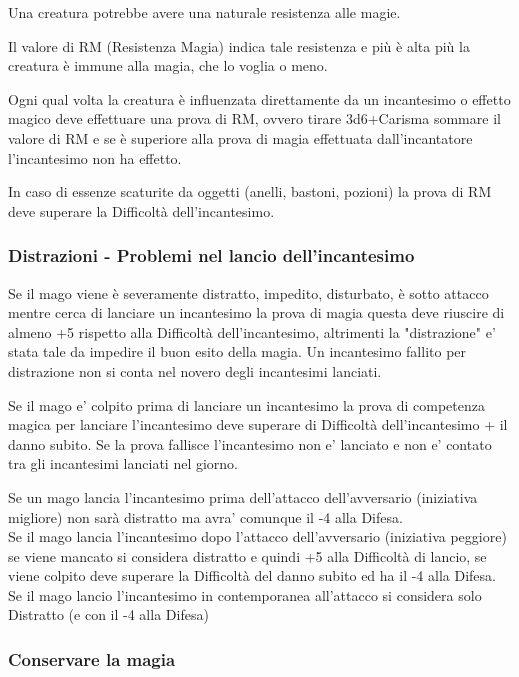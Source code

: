 \begin{multicols}{2}
Una creatura potrebbe avere una naturale resistenza alle magie.

Il valore di RM (Resistenza Magia) indica tale resistenza e più è alta più la creatura è immune alla magia, che lo voglia o meno.

Ogni qual volta la creatura è influenzata direttamente da un incantesimo o effetto magico deve effettuare una prova di RM, ovvero tirare 3d6+Carisma sommare il valore di RM e se è superiore alla prova di magia effettuata dall'incantatore l'incantesimo non ha effetto.

In caso di essenze scaturite da oggetti (anelli, bastoni, pozioni) la prova di RM deve superare la Difficoltà dell'incantesimo.

\subsubsection{Distrazioni - Problemi nel lancio dell'incantesimo}

Se il mago viene è severamente distratto, impedito, disturbato, è sotto attacco mentre cerca di lanciare un incantesimo la prova di magia questa deve riuscire di almeno +5 rispetto alla Difficoltà dell'incantesimo, altrimenti la "distrazione" e' stata tale da impedire il buon esito della magia.
Un incantesimo fallito per distrazione non si conta nel novero degli incantesimi lanciati.

Se il mago e' colpito prima di lanciare un incantesimo la prova di competenza magica per lanciare l'incantesimo deve superare di Difficoltà dell'incantesimo + il danno subito. Se la prova fallisce l'incantesimo non e' lanciato e non e' contato tra gli incantesimi lanciati nel giorno.

Se un mago lancia l'incantesimo prima dell'attacco dell'avversario (iniziativa migliore) non sarà distratto ma avra' comunque il -4 alla Difesa.\\
Se il mago lancia l'incantesimo dopo l'attacco dell'avversario (iniziativa peggiore) se viene mancato si considera distratto e quindi +5 alla Difficoltà di lancio, se viene colpito deve superare la Difficoltà del danno subito ed ha il -4 alla Difesa.\\
Se il mago lancio l'incantesimo in contemporanea all'attacco si considera solo Distratto (e con il -4 alla Difesa)\\

\subsubsection{Conservare la magia}


\end{multicols}
